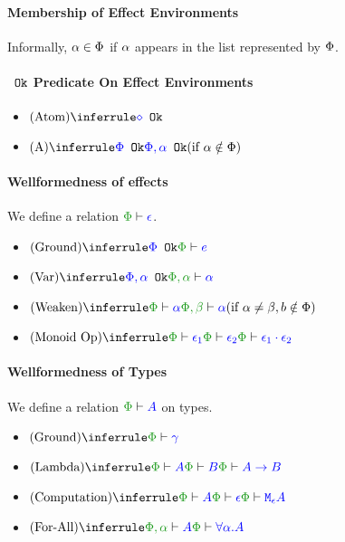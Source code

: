 \documentclass{report}
\begin{document}
\paragraph{Membership of Effect Environments}
Informally, $\a \in \P$ if $\a$ appears in the list represented by $\P$.

\paragraph{$\ok{}$ Predicate On Effect Environments}
\begin{itemize}
    \item $\ntreerulez{Atom}{\ok{\nil}}$
    \item $\condtreeruleI{A}{\ok{\P}}{\ok{\P, \a}}{ \a\notin \P}$
\end{itemize}

\paragraph{Wellformedness of effects}
We define a relation $\wellformed{\P}{\e}$.

\begin{itemize}
    \item $\ntreeruleI{Ground}{\ok{\P}}{\wellformed{\P}{e}}$
    \item $\ntreeruleI{Var}{\ok{\P,\a}}{\wellformed{\P,\a}{\a}}$
    \item $\condtreeruleI{Weaken}{\wellformed{\P}{\a}}{\wellformed{\P,\b}{\a}}{\a\neq\b, b\notin\P}$
    \item $\ntreeruleII{Monoid Op}{\wellformed{\P}{\e_1}}{\wellformed{\P}{\e_2}}{\wellformed{\P}{\e_1\dot\e_2}}$
\end{itemize}

\paragraph{Wellformedness of Types}
We define a relation $\wellformed{\P}{A}$ on types.

\begin{itemize}
    \item $\ntreerulez{Ground}{\wellformed{\P}{\g}}$
    \item $\ntreeruleII{Lambda}{\wellformed{\P}{A}}{\wellformed{\P}{B}}{\wellformed{\P}{\ab}}$
    \item $\ntreeruleII{Computation}{\wellformed{\P}{A}}{\wellformed{\P}{\e}}{\wellformed{\P}{\mea}}$
    \item $\ntreeruleI{For-All}{\wellformed{\P,\a}{A}}{\wellformed{\P}{\all{\a}{A}}}$
\end{itemize}
\end{document}
